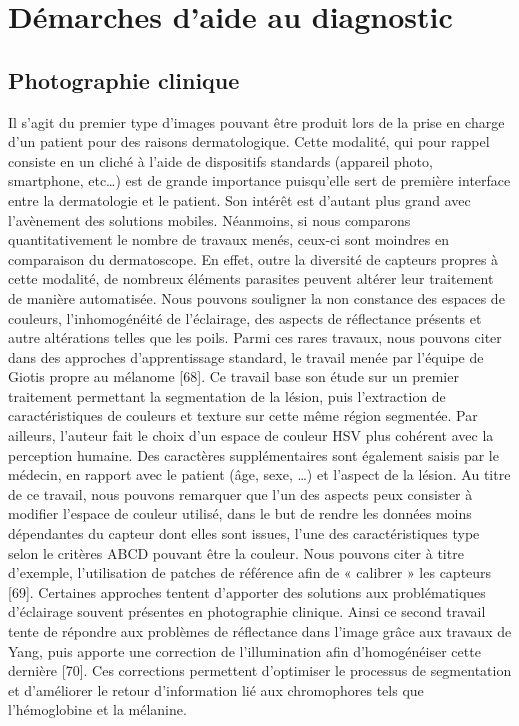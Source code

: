 \section{Démarches d'aide au diagnostic}
\label{sec:cad_methods}
\subsection{Photographie clinique}
Il s’agit du premier type d’images pouvant être produit lors de la prise en charge d’un patient pour des raisons dermatologique. Cette modalité, qui pour rappel consiste en un cliché à l’aide de dispositifs standards (appareil photo, smartphone, etc…) est de grande importance puisqu’elle sert de première interface entre la dermatologie et le patient. Son intérêt est d’autant plus grand avec l’avènement des solutions mobiles.
Néanmoins, si nous comparons quantitativement le nombre de travaux menés, ceux-ci sont moindres en comparaison du dermatoscope. En effet, outre la diversité de capteurs propres à cette modalité, de nombreux éléments parasites peuvent altérer leur traitement de manière automatisée. Nous pouvons souligner la non constance des espaces de couleurs, l’inhomogénéité de l’éclairage, des aspects de réflectance présents et autre altérations telles que les poils. 
Parmi ces rares travaux, nous pouvons citer dans des approches d’apprentissage standard, le travail menée par l’équipe de Giotis propre au mélanome [68]. Ce travail base son étude sur un premier traitement permettant la segmentation de la lésion, puis l’extraction de caractéristiques de couleurs et texture sur cette même région segmentée. Par ailleurs, l’auteur fait le choix d’un espace de couleur HSV plus cohérent avec la perception humaine. Des caractères supplémentaires sont également saisis par le médecin, en rapport avec le patient (âge, sexe, …) et l’aspect de la lésion.
Au titre de ce travail, nous pouvons remarquer que l’un des aspects peux consister à modifier l’espace de couleur utilisé, dans le but de rendre les données moins dépendantes du capteur dont elles sont issues, l’une des caractéristiques type selon le critères ABCD pouvant être la couleur. Nous pouvons citer à titre d’exemple, l’utilisation de patches de référence afin de « calibrer » les capteurs [69].
Certaines approches tentent d’apporter des solutions aux problématiques d’éclairage souvent présentes en photographie clinique. Ainsi ce second travail tente de répondre aux problèmes de réflectance dans l’image grâce aux travaux de Yang, puis apporte une correction de l’illumination afin d’homogénéiser cette dernière [70]. Ces corrections permettent d’optimiser le processus de segmentation et d’améliorer le retour d’information lié aux chromophores tels que l’hémoglobine et la mélanine.
